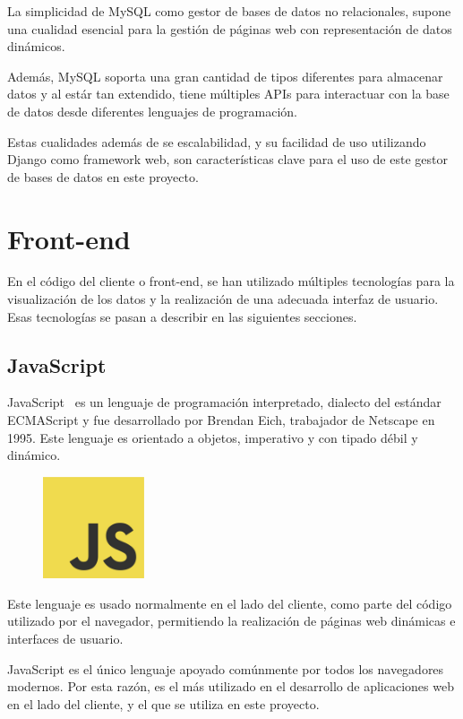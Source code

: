\documentclass[a4paper, spanish, 12pt]{book}
\begin{document}
La simplicidad de MySQL como gestor de bases de datos no relacionales, supone una
cualidad esencial para la gesti\'on de p\'aginas web con representaci\'on de datos
din\'amicos.

Adem\'as, MySQL soporta una gran cantidad de tipos diferentes para almacenar datos
y al est\'ar tan extendido, tiene m\'ultiples APIs para interactuar con la base de datos desde
diferentes lenguajes de programaci\'on.

Estas cualidades adem\'as de se escalabilidad, y su facilidad de uso utilizando Django
como framework web, son caracter\'isticas clave para el uso de este gestor de bases
de datos en este proyecto.

\section{Front-end}
\label{sec:front-end}

En el c\'odigo del cliente o front-end, se han utilizado m\'ultiples tecnolog\'ias
para la visualizaci\'on de los datos y la realizaci\'on de una adecuada interfaz
de usuario. Esas tecnolog\'ias se pasan a describir en las siguientes secciones.

\subsection{JavaScript}
\label{subsec:js}

JavaScript~\cite{js} es un lenguaje de programaci\'on interpretado, dialecto del est\'andar
ECMAScript y fue desarrollado por Brendan Eich, trabajador de Netscape en 1995.
Este lenguaje es orientado a objetos, imperativo y con tipado d\'ebil y din\'amico.

\begin{figure}[H]
  \centering
  \includegraphics[width=3cm, keepaspectratio]{img/js-logo}
\end{figure}

Este lenguaje es usado normalmente en el lado del cliente, como parte del c\'odigo
utilizado por el navegador, permitiendo la realizaci\'on de p\'aginas web din\'amicas
e interfaces de usuario.

JavaScript es el \'unico lenguaje apoyado com\'unmente por todos los navegadores modernos.
Por esta raz\'on, es el m\'as utilizado en el desarrollo de aplicaciones web en el
lado del cliente, y el que se utiliza en este proyecto.
\end{document}
